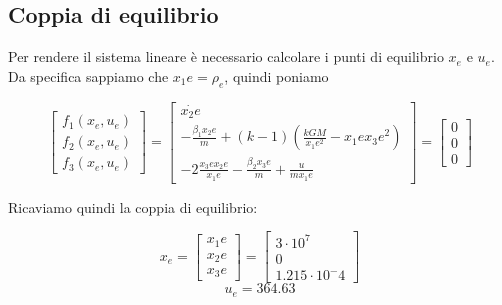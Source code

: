 \documentclass{article}
\begin{document}
\subsection{Coppia di equilibrio}
Per rendere il sistema lineare è necessario calcolare i punti di equilibrio $x_e$ e $u_e$.\\
Da specifica sappiamo che $x_1e=\rho_e$, quindi poniamo
\begin{large}
\[
\begin{bmatrix} f_1(x_e,u_e) \\ f_2(x_e,u_e) \\ f_3(x_e,u_e)\end{bmatrix} =
\begin{bmatrix} \dot{x_2e} \\
-\frac{\beta_1 x_2e}{m} + (k-1)(\frac{kG M}{x_1e^2} - x_1e x_3e^2) \\ 
-2\frac{x_3e x_2e}{x_1e} - \frac{\beta_2 x_3e}{m} + \frac{u}{m x_1e}  \end{bmatrix} =
\begin{bmatrix} 0 \\ 0 \\ 0\end{bmatrix}
\]
\end{large}
Ricaviamo quindi la coppia di equilibrio:
\begin{large}
\[
x_e=\begin{bmatrix} x_1e \\ x_2e \\ x_3e\end{bmatrix}=
\begin{bmatrix} 3\cdot10^7 \\ 0 \\ 1.215\cdot10^-4\end{bmatrix}
\]
\[
u_e=364.63
\]
\end{large}
\end{document}
